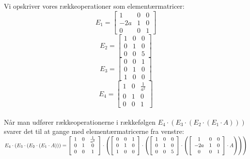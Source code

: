 \documentclass[a4paper,12pt]{article}
\begin{document}
\subsection{}
Vi opskriver vores rækkeoperationer som elementærmatricer:\\
\[
E_1=
\left[\begin{array}{ccc}
    1 & 0 & 0 \\
    -2a & 1 & 0 \\
    0 & 0 & 1
\end{array}\right]
\]
\[
E_2=
\left[\begin{array}{ccc}
    1 & 0 & 0 \\
    0 & 1 & 0 \\
    0 & 0 & 5
\end{array}\right]
\]
\[
E_3=
\left[\begin{array}{ccc}
    0 & 0 & 1 \\
    0 & 1 & 0 \\
    1 & 0 & 0
\end{array}\right]
\]
\[
E_4=
\left[\begin{array}{ccc}
    1 & 0 & \frac{1}{a^2} \\
    0 & 1 & 0 \\
    0 & 0 & 1
\end{array}\right]
\]\\

Når man udfører række­operationerne i rækkefølgen $E_4 \cdot (E_3 \cdot (E_2 \cdot (E_1 \cdot A)))$ svarer det til at gange med elementærmatricerne fra venstre:\\

$
E_4 \cdot (E_3 \cdot (E_2 \cdot (E_1 \cdot A))) 
=
\left[\begin{array}{ccc}
    1 & 0 & \frac{1}{a^2} \\
    0 & 1 & 0 \\
    0 & 0 & 1
\end{array}\right]
\cdot \left( 
\left[\begin{array}{ccc}
    0 & 0 & 1 \\
    0 & 1 & 0 \\
    1 & 0 & 0
\end{array}\right]
\cdot \left( 
\left[\begin{array}{ccc}
    1 & 0 & 0 \\
    0 & 1 & 0 \\
    0 & 0 & 5
\end{array}\right]
\cdot \left( 
\left[\begin{array}{ccc}
    1 & 0 & 0 \\
    -2a & 1 & 0 \\
    0 & 0 & 1
\end{array}\right]
\cdot A\right)\right)\right)
$\\
\end{document}
